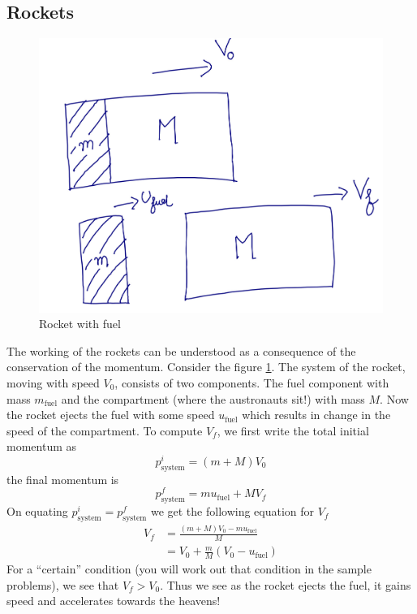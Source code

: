 \documentclass[10pt]{article}
\begin{document}
\subsection{Rockets}
\begin{figure}[h]
\includegraphics[scale=.4]{rocket}
\centering
\caption{Rocket with fuel}
\label{rockfuel}
\centering
\end{figure}
The working of the rockets can be understood as a consequence of the conservation of the momentum.  Consider the figure \ref{rockfuel}.  The system of the rocket, moving with speed $V_0$, consists of two components.  The fuel component with mass $m_{\text{fuel}}$ and the compartment (where the austronauts sit!) with mass $M$.  Now the rocket ejects the fuel with some speed $u_{\text{fuel}}$ which results in change in the speed of the compartment.
To compute $V_f$, we first write the total initial momentum as
\begin{equation}
  p_{\text{system}}^i=(m+M)V_0
\end{equation}
the final momentum is 
\begin{equation}
  p_{\text{system}}^f=mu_{\text{fuel}}+MV_f
\end{equation}
On equating $p_{\text{system}}^i=p_{\text{system}}^f$ we get the following equation for $V_f$
\begin{equation}
\begin{split}
  V_f &= \frac{(m+M)V_0 - mu_{\text{fuel}}}{M}\\
  &= V_0 + \frac{m}{M}(V_0-u_{\text{fuel}})
\end{split}
\end{equation}
For a ``certain'' condition (you will work out that condition in the sample problems), we see that $V_f>V_0$.  Thus we see as the rocket ejects the fuel, it gains speed and accelerates towards the heavens!
\end{document}
